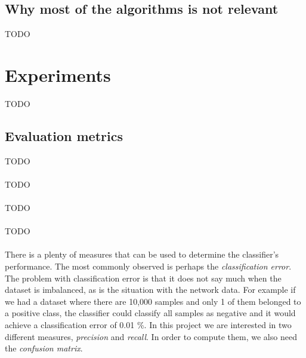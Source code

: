 \documentclass[11pt]{article}
\begin{document}
    \subsection{Why most of the algorithms is not relevant}
      {\color{red}TODO}
  \newpage
  \section{Experiments}
    {\color{red}TODO}
    \subsection{Evaluation metrics}
      {\color{red}TODO}
      \\~\\
      {\color{red}TODO}
      \\~\\
      {\color{red}TODO}
      \\~\\
      {\color{red}TODO}
      \\~\\
      There is a plenty of measures that can be used to determine the classifier's performance. The most commonly observed is perhaps the {\it classification error}\cite{brabec}. The problem with classification error is that it does not say much when the dataset is imbalanced, as is the situation with the network data. For example if we had a dataset where there are 10,000 samples and only 1 of them belonged to a positive class, the classifier could classify all samples as negative and it would achieve a classification error of 0.01 \%. In this project we are interested in two different measures, {\it precision} and {\it recall}. In order to compute them, we also need the {\it confusion matrix}.
\end{document}
